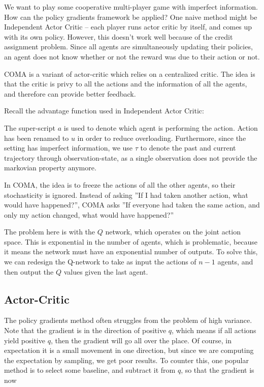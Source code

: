 \documentclass[12pt]{article}
\begin{document}
We want to play some cooperative multi-player game with imperfect information. How can the policy gradients framework be applied? One naive method might be Independent Actor Critic -- each player runs actor critic by itself, and comes up with its own policy. However, this doesn't work well because of the credit assignment problem. Since all agents are simultaneously updating their policies, an agent does not know whether or not the reward was due to their action or not.

COMA is a variant of actor-critic which relies on a centralized critic. The idea is that the critic is privy to all the actions and the information of all the agents, and therefore can provide better feedback. 

Recall the advantage function used in Independent Actor Critic:


The super-script $a$ is used to denote which agent is performing the action. Action has been renamed to $u$ in order to reduce overloading. Furthermore, since the setting has imperfect information, we use $\tau$ to denote the past and current trajectory through observation-state, as a single observation does not provide the markovian property anymore.

In COMA, the idea is to freeze the actions of all the other agents, so their stochasticity is ignored. Instead of asking ''If I had taken another action, what would have happened?'', COMA asks ''If everyone had taken the same action, and only my action changed, what would have happened?''


The problem here is with the $Q$ network, which operates on the joint action space. This is exponential in the number of agents, which is problematic, because it means the network must have an exponential number of outputs. To solve this, we can redesign the Q-network to take as input the actions of $n-1$ agents, and then output the $Q$ values given the last agent. 

\subsection{Actor-Critic}

The policy gradients method often struggles from the problem of high variance. Note that the gradient is in the direction of positive $q$, which means if all actions yield positive $q$, then the gradient will go all over the place. Of course, in expectation it is a small movement in one direction, but since we are computing the expectation by sampling, we get poor results. To counter this, one popular method is to select some baseline, and subtract it from $q$, so that the gradient is now
\end{document}
